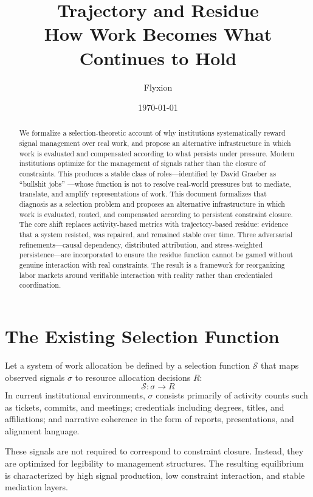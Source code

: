 \documentclass[12pt]{article}
\title{\textbf{Trajectory and Residue}\\[0.5em]
\large How Work Becomes What Continues to Hold}
\author{Flyxion}
\date{\today}
\begin{document}
\maketitle

\begin{abstract}
We formalize a selection-theoretic account of why institutions
systematically reward signal management over real work, and propose an
alternative infrastructure in which work is evaluated and compensated
according to what persists under pressure. Modern institutions optimize
for the management of signals rather than the closure of constraints.
This produces a stable class of
roles---identified by David Graeber as ``bullshit jobs'' \cite{graeber2018}---whose
function is not to resolve real-world pressures but to mediate,
translate, and amplify representations of work. This document
formalizes that diagnosis as a selection problem and proposes an
alternative infrastructure in which work is evaluated, routed, and
compensated according to persistent constraint closure. The core shift
replaces activity-based metrics with trajectory-based residue: evidence
that a system resisted, was repaired, and remained stable over time.
Three adversarial refinements---causal dependency, distributed
attribution, and stress-weighted persistence---are incorporated to
ensure the residue function cannot be gamed without genuine interaction
with real constraints. The result is a framework for reorganizing labor
markets around verifiable interaction with reality rather than
credentialed coordination.
\end{abstract}

\newpage

\section{The Existing Selection Function}

Let a system of work allocation be defined by a selection function
$\mathcal{S}$ that maps observed signals $\sigma$ to resource allocation
decisions $R$:
\[
  \mathcal{S} : \sigma \rightarrow R
\]
In current institutional environments, $\sigma$ consists primarily of
activity counts such as tickets, commits, and meetings; credentials
including degrees, titles, and affiliations; and narrative coherence in
the form of reports, presentations, and alignment language.

These signals are not required to correspond to constraint closure.
Instead, they are optimized for legibility to management structures.
The resulting equilibrium is characterized by high signal production,
low constraint interaction, and stable mediation layers.
\end{document}
